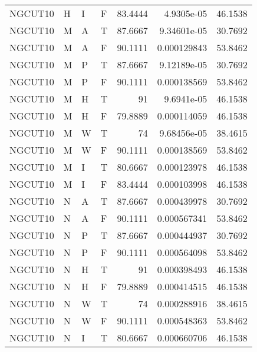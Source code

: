 \begin{longtable}{llllrrr}
    NGCUT10  & H         & I         & F          & 83.4444    & 4.9305e-05  & 46.1538  \\
    NGCUT10  & M         & A         & T          & 87.6667    & 9.34601e-05 & 30.7692  \\
    NGCUT10  & M         & A         & F          & 90.1111    & 0.000129843 & 53.8462  \\
    NGCUT10  & M         & P         & T          & 87.6667    & 9.12189e-05 & 30.7692  \\
    NGCUT10  & M         & P         & F          & 90.1111    & 0.000138569 & 53.8462  \\
    NGCUT10  & M         & H         & T          & 91         & 9.6941e-05  & 46.1538  \\
    NGCUT10  & M         & H         & F          & 79.8889    & 0.000114059 & 46.1538  \\
    NGCUT10  & M         & W         & T          & 74         & 9.68456e-05 & 38.4615  \\
    NGCUT10  & M         & W         & F          & 90.1111    & 0.000138569 & 53.8462  \\
    NGCUT10  & M         & I         & T          & 80.6667    & 0.000123978 & 46.1538  \\
    NGCUT10  & M         & I         & F          & 83.4444    & 0.000103998 & 46.1538  \\
    NGCUT10  & N         & A         & T          & 87.6667    & 0.000439978 & 30.7692  \\
    NGCUT10  & N         & A         & F          & 90.1111    & 0.000567341 & 53.8462  \\
    NGCUT10  & N         & P         & T          & 87.6667    & 0.000444937 & 30.7692  \\
    NGCUT10  & N         & P         & F          & 90.1111    & 0.000564098 & 53.8462  \\
    NGCUT10  & N         & H         & T          & 91         & 0.000398493 & 46.1538  \\
    NGCUT10  & N         & H         & F          & 79.8889    & 0.000414515 & 46.1538  \\
    NGCUT10  & N         & W         & T          & 74         & 0.000288916 & 38.4615  \\
    NGCUT10  & N         & W         & F          & 90.1111    & 0.000548363 & 53.8462  \\
    NGCUT10  & N         & I         & T          & 80.6667    & 0.000660706 & 46.1538  \\

\end{longtable}
